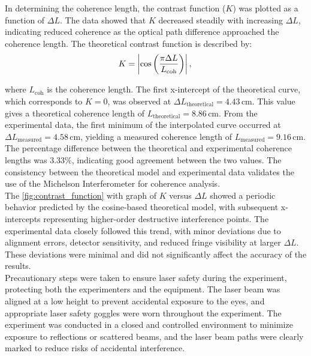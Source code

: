 \documentclass[a4paper,11pt]{article}
\begin{document}
In determining the coherence length, the contrast function ($K$) was plotted as a function of $\Delta L$. The data showed that $K$ decreased steadily with increasing $\Delta L$, indicating reduced coherence as the optical path difference approached the coherence length. The theoretical contrast function is described by:
\[
K = \left| \cos \left( \frac{\pi \Delta L}{L_{\text{coh}}} \right) \right|,\\
\]

where $L_{\text{coh}}$ is the coherence length. The first x-intercept of the theoretical curve, which corresponds to $K = 0$, was observed at $\Delta L_{\text{theoretical}} = 4.43 \, \text{cm}$. This value gives a theoretical coherence length of $L_{\text{theoretical}} = 8.86 \, \text{cm}$. From the experimental data, the first minimum of the interpolated curve occurred at $\Delta L_{\text{measured}} = 4.58 \, \text{cm}$, yielding a measured coherence length of $L_{\text{measured}} = 9.16 \, \text{cm}$. The percentage difference between the theoretical and experimental coherence lengths was $3.33\%$, indicating good agreement between the two values. The consistency between the theoretical model and experimental data validates the use of the Michelson Interferometer for coherence analysis.\\

The  \autoref{fig:contrast_function} with graph of $K$ versus $\Delta L$ showed a periodic behavior predicted by the cosine-based theoretical model, with subsequent x-intercepts representing higher-order destructive interference points. The experimental data closely followed this trend, with minor deviations due to alignment errors, detector sensitivity, and reduced fringe visibility at larger $\Delta L$. These deviations were minimal and did not significantly affect the accuracy of the results.\\

Precautionary steps were taken to ensure laser safety during the experiment, protecting both the experimenters and the equipment. The laser beam was aligned at a low height to prevent accidental exposure to the eyes, and appropriate laser safety goggles were worn throughout the experiment. The experiment was conducted in a closed and controlled environment to minimize exposure to reflections or scattered beams, and the laser beam paths were clearly marked to reduce risks of accidental interference.\\
\end{document}
